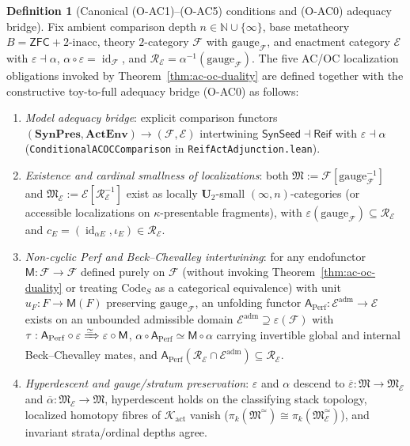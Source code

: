 \documentclass[11pt]{article}
\theoremstyle{plain}
\theoremstyle{definition}
\newtheorem{definition}[theorem]{Definition}
\newcommand{\cF}{\mathcal{F}}
\newcommand{\fM}{\mathfrak{M}}
\newcommand{\ZFC}{\mathsf{ZFC}}
\newcommand{\cE}{\mathcal{E}}
\DeclareMathOperator{\id}{id}
\begin{document}
\begin{definition}[Canonical \textup{(O-AC1)--(O-AC5)} conditions and \textup{(O-AC0)} adequacy bridge]\label{def:o-ac-conditions}
Fix ambient comparison depth $n \in \mathbb{N} \cup \{\infty\}$, base metatheory $B = \ZFC + 2\text{-}\mathrm{inacc}$, theory $2$-category $\cF$ with $\mathrm{gauge}_\cF$, and enactment category $\cE$ with $\varepsilon \dashv \alpha$, $\alpha \circ \varepsilon = \id_\cF$, and $\mathcal{R}_\cE = \alpha^{-1}(\mathrm{gauge}_\cF)$. The five AC/OC localization obligations invoked by Theorem~\ref{thm:ac-oc-duality} are defined together with the constructive toy-to-full adequacy bridge \textup{(O-AC0)} as follows:
\begin{enumerate}[nosep,label=\textup{(O-AC\arabic*)},start=0]
\item \emph{Model adequacy bridge}: explicit comparison functors $(\mathbf{SynPres}, \mathbf{ActEnv}) \to (\cF, \cE)$ intertwining $\mathsf{SynSeed} \dashv \mathsf{Reif}$ with $\varepsilon \dashv \alpha$ (\texttt{ConditionalACOCComparison} in \texttt{ReifActAdjunction.lean}).
\item \emph{Existence and cardinal smallness of localizations}: both $\fM := \cF[\mathrm{gauge}_\cF^{-1}]$ and $\fM_\cE := \cE[\mathcal{R}_\cE^{-1}]$ exist as locally $\mathbf{U}_2$-small $(\infty, n)$-categories (or accessible localizations on $\kappa$-presentable fragments), with $\varepsilon(\mathrm{gauge}_\cF) \subseteq \mathcal{R}_\cE$ and $c_E = (\id_{\alpha E}, \iota_E) \in \mathcal{R}_\cE$.
\item \emph{Non-cyclic \textup{Perf} and Beck--Chevalley intertwining}: for any endofunctor $\mathsf{M} : \cF \to \cF$ defined purely on $\cF$ (without invoking Theorem~\ref{thm:ac-oc-duality} or treating $\mathrm{Code}_S$ as a categorical equivalence) with unit $u_F : F \to \mathsf{M}(F)$ preserving $\mathrm{gauge}_\cF$, an unfolding functor $\mathsf{A}_{\mathrm{Perf}} : \cE^{\mathrm{adm}} \to \cE$ exists on an unbounded admissible domain $\cE^{\mathrm{adm}} \supseteq \varepsilon(\cF)$ with $\tau : \mathsf{A}_{\mathrm{Perf}} \circ \varepsilon \xRightarrow{\simeq} \varepsilon \circ \mathsf{M}$, $\alpha \circ \mathsf{A}_{\mathrm{Perf}} \simeq \mathsf{M} \circ \alpha$ carrying invertible global and internal Beck--Chevalley mates, and $\mathsf{A}_{\mathrm{Perf}}(\mathcal{R}_\cE \cap \cE^{\mathrm{adm}}) \subseteq \mathcal{R}_\cE$.
\item \emph{Hyperdescent and gauge/stratum preservation}: $\varepsilon$ and $\alpha$ descend to $\overline{\varepsilon} : \fM \to \fM_\cE$ and $\overline{\alpha} : \fM_\cE \to \fM$, hyperdescent holds on the classifying stack topology, localized homotopy fibres of $\mathcal{K}_{\mathrm{act}}$ vanish ($\pi_k(\fM^\simeq) \cong \pi_k(\fM_\cE^\simeq)$), and invariant strata/ordinal depths agree.

\end{enumerate}
\end{definition}
\end{document}
